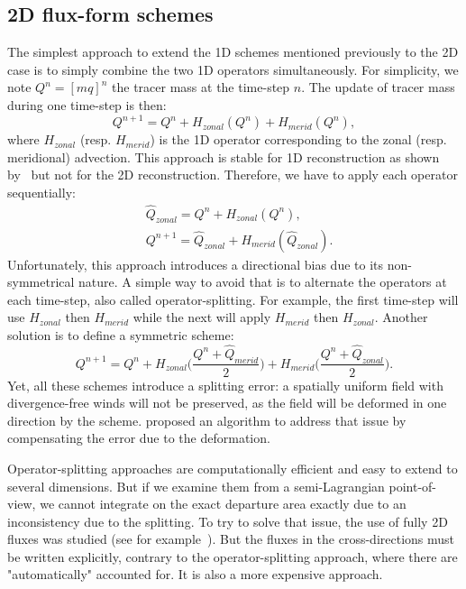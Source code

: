 \subsection{2D flux-form schemes}
\label{subsec:2d_ff}
The simplest approach to extend the 1D schemes mentioned previously to the 2D
case is to simply combine the two 1D operators simultaneously. For simplicity,
we note $Q^n=[mq]^n$ the tracer mass at the time-step $n$. The update of tracer
mass during one time-step is then:
\begin{equation}
  Q^{n+1} = Q^{n} + H_{zonal}(Q^n) + H_{merid}(Q^n),
\end{equation}
where $H_{zonal}$ (resp. $H_{merid}$) is the 1D operator corresponding to the
zonal (resp. meridional) advection.  This approach is stable for 1D
reconstruction as shown by~\cite{Leonard1996} but not for the 2D
reconstruction. Therefore, we have to apply each operator sequentially:
\begin{align}
  \label{eqn:split1}
  &\widehat{Q}_{zonal} = Q^{n} + H_{zonal}(Q^n),\\
  \label{eqn:split2}
  &Q^{n+1} = \widehat{Q}_{zonal} + H_{merid}(\widehat{Q}_{zonal}).
\end{align}
Unfortunately, this approach introduces a directional bias due to its
non-symmetrical nature. A simple way to avoid that is to alternate the operators
at each time-step, also called operator-splitting. For example, the first
time-step will use $H_{zonal}$ then $H_{merid}$ while the next will apply
$H_{merid}$ then $H_{zonal}$. Another solution is to define a symmetric scheme:
\begin{equation}
  Q^{n+1} = Q^n + H_{zonal}\Big(\frac{Q^n + \widehat{Q}_{merid}}{2}\Big) + 
  H_{merid}\Big(\frac{Q^n + \widehat{Q}_{zonal}}{2}\Big).
\end{equation}
Yet, all these schemes introduce a splitting error: a spatially uniform field with
divergence-free winds will not be preserved, as the field will be deformed in
one direction by the scheme. \cite{Lin1996} proposed an algorithm to address
that issue by compensating the error due to the deformation.

Operator-splitting approaches are computationally efficient and easy to extend
to several dimensions. But if we examine them from a semi-Lagrangian
point-of-view, we cannot integrate on the exact departure area exactly due to an
inconsistency due to the splitting. To try to solve that issue, the use of fully
2D fluxes was studied (see for example~\cite{Rasch1994,Dukowicz2000}). But the
fluxes in the cross-directions must be written explicitly, contrary to the
operator-splitting approach, where there are "automatically" accounted for. It
is also a more expensive approach.

